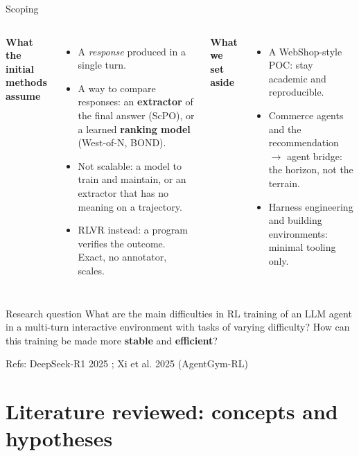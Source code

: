 \documentclass[aspectratio=169,10pt]{beamer}
\newcommand{\refs}[1]{\vfill{\tiny\textcolor{crMid}{Refs: #1}}}
\newcommand{\hl}[1]{\textcolor{crOrange}{\textbf{#1}}}
\begin{document}
\begin{frame}{Scoping}
\begin{columns}[T]
\textbf{What the initial methods assume}
\begin{itemize}
  \item A \emph{response} produced in a single turn.
  \item A way to compare responses: an \hl{extractor} of the final answer (ScPO), or a learned \hl{ranking model} (West-of-N, BOND).
  \item Not scalable: a model to train and maintain, or an extractor that has no meaning on a trajectory.
  \item RLVR instead: a program verifies the outcome. Exact, no annotator, scales.
\end{itemize}
\textbf{What we set aside}
\begin{itemize}
  \item A WebShop-style POC: stay academic and reproducible.
  \item Commerce agents and the recommendation $\to$ agent bridge: the horizon, not the terrain.
  \item Harness engineering and building environments: minimal tooling only.
\end{itemize}
\end{columns}
\vspace{0.25cm}
\begin{block}{Research question}
\normalsize What are the main difficulties in RL training of an LLM agent in a multi-turn interactive environment with tasks of varying difficulty? How can this training be made more \textbf{stable} and \textbf{efficient}?
\end{block}
\refs{DeepSeek-R1 2025 ; Xi et al. 2025 (AgentGym-RL)}
\end{frame}

\section{Literature reviewed: concepts and hypotheses}
\end{document}
